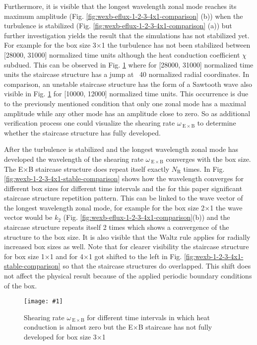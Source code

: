 \documentclass[aip, amsmath, amssymb, reprint, twocolumn]{revtex4-1}
\newcommand{\includegraphicsOneCol}[3]{
	\begin{figure}[ht]
		\texttt{[image: \#1]}
		\caption{#2}
		\label{#3}
  	\end{figure}
  	\increasecounter{fig}{1}
}
\begin{document}
Furthermore, it is visible that the longest wavelength zonal mode reaches its maximum amplitude (Fig. \ref{fig:wexb-eflux-1-2-3-4x1-comparison} (b)) when the turbulence is stabilized  (Fig. \ref{fig:wexb-eflux-1-2-3-4x1-comparison} (a)) but further investigation yields the result that the simulations has not stabilized yet. For example for the box size 3$\times$1 the turbulence has not been stabilized between [28000, 31000] normalized time units although the heat conduction coefficient $\chi$ subdued. This can be observed in Fig. \ref{fig:wexb-3x1-selection} where for [28000, 31000] normalized time units the staircase structure has a jump at ~40 normalized radial coordinates. In comparison, an unstable staircase structure has the form of a Sawtooth wave also visible in Fig. \ref{fig:wexb-3x1-selection} for [10000, 12000] normalized time units. This occurrence is due to the previously mentioned condition that only one zonal mode has a maximal amplitude while any other mode has an amplitude close to zero. So as additional verification process one could visualize the shearing rate $\omega_{\mathrm{\:E \times B}}$ to determine whether the staircase structure has fully developed. 

After the turbulence is stabilized and the longest wavelength zonal mode has developed the wavelength of the shearing rate $\omega_{\mathrm{\:E \times B}}$ converges with the box size. The E$\times$B staircase structure does repeat itself exactly $N_\mathrm{R}$ times. In Fig. \ref{fig:wexb-1-2-3-4x1-stable-comparison} shows how the wavelength converges for different box sizes for different time intervals and the for this paper significant staircase structure repetition pattern. This can be linked to the wave vector of the longest wavelength zonal mode, for example for the box size 2$\times$1 the wave vector would be $k_2$ (Fig. \ref{fig:wexb-eflux-1-2-3-4x1-comparison}(b)) and the staircase structure repeats itself 2 times which shows a convergence of the structure to the box size. It is also visible that the Waltz rule applies for radially increased box sizes as well. Note that for clearer visibility the staircase structure for box size 1$\times$1 and for 4$\times$1 got shifted to the left in Fig. \ref{fig:wexb-1-2-3-4x1-stable-comparison} so that the staircase structures do overlapped. This shift does not affect the physical result because of the applied periodic boundary conditions of the box. 

\includegraphicsOneCol{S6_rlt6.0/boxsize3x1/Ns16/Nvpar48/Nmu9/S6_rlt6.0_boxsize3x1_Ns16_Nvpar48_Nmu9_wexb_selection.pdf}{
	Shearing rate $\omega_{\mathrm{\:E \times B}}$ for different time intervals in which heat conduction is almost zero but the E$\times$B staircase has not fully developed for box size 3$\times$1
}{fig:wexb-3x1-selection}
\end{document}
